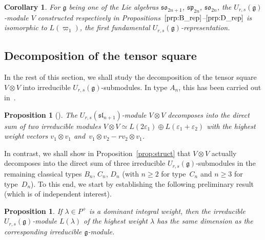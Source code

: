 \documentclass[10pt,a4paper]{amsart}
\numberwithin{equation}{section}
\newtheorem{Corollary}[Theorem]{Corollary}
\newtheorem{Proposition}[Theorem]{Proposition}
 { \theoremstyle{definition}
\newtheorem{Definition}[Theorem]{Definition}
\newtheorem{Note}[Theorem]{Note}
\newtheorem{Example}[Theorem]{Example}
\newtheorem{Remark}[Theorem]{Remark} }
\newcommand{\fg}{\mathfrak{g}}
\newcommand{\ssl}{\mathfrak{sl}}
\newcommand{\sso}{\mathfrak{so}}
\newcommand{\ssp}{\mathfrak{sp}}
\newcommand{\uu}{U_{r,s}(\fg)}
\begin{document}
\begin{Corollary}
For $\fg$ being one of the Lie algebras $\sso_{2n+1}$, $\ssp_{2n}$, $\sso_{2n}$, the $U_{r,s}(\fg)$-module $V$ constructed respectively in Propositions~$\ref{prp:B_rep}$--$\ref{prp:D_rep}$ is isomorphic to $L(\varpi_1)$, the first fundamental $\uu$-representation.
\end{Corollary}

\subsection{Decomposition of the tensor square}%

In the rest of this section, we shall study the decomposition of the tensor square $V\otimes V$ into irreducible $U_{r,s}(\fg)$-submodules. In type $A_n$, this has been carried out in~\cite[Proposition~5.3]{BW2}.

\begin{Proposition}[{\cite{BW2}}]
The $U_{r,s}(\ssl_{n+1})$-module $V\otimes V$ decomposes into the direct sum of two irreducible modules $V\otimes V\simeq L(2\varepsilon_1)\oplus L(\varepsilon_1+\varepsilon_2)$ with the highest weight vectors $v_1\otimes v_1$ and~${v_1\otimes v_2 - r v_2\otimes v_1}$.
\end{Proposition}

In contrast, we shall show in Proposition~\ref{prop:struct} that $V\otimes V$ actually decomposes into the direct sum of three irreducible $U_{r,s}(\fg)$-submodules in the remaining classical types $B_n$, $C_n$, $D_n$ (with $n\geq 2$ for type~$C_n$ and $n\geq 3$ for type~$D_n$). To this end, we start by establishing the following preliminary result (which is of independent interest).

\begin{Proposition}\label{lem:dim}
If $\lambda \in P^+$ is a dominant integral weight, then the irreducible $U_{r,s}(\fg)$-module $L(\lambda)$ of the highest weight $\lambda$ has the same dimension as the corresponding irreducible $\fg$-module.
\end{Proposition}
\end{document}
